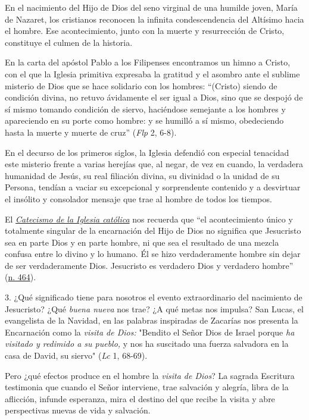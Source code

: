 En el nacimiento del Hijo de Dios del seno virginal de una humilde
joven, María de Nazaret, los cristianos reconocen la infinita
condescendencia del Altísimo hacia el hombre. Ese acontecimiento, junto
con la muerte y resurrección de Cristo, constituye el culmen de la
historia.

En la carta del apóstol Pablo a los Filipenses encontramos un himno a
Cristo, con el que la Iglesia primitiva expresaba la gratitud y el
asombro ante el sublime misterio de Dios que se hace solidario con los
hombres: ``(Cristo) siendo de condición divina, no retuvo ávidamente el
ser igual a Dios, sino que se despojó de sí mismo tomando condición de
siervo, haciéndose semejante a los hombres y apareciendo en su porte
como hombre: y se humilló a sí mismo, obedeciendo hasta la muerte y
muerte de cruz'' (\emph{Flp} 2, 6-8).

En el decurso de los primeros siglos, la Iglesia defendió con especial
tenacidad este misterio frente a varias herejías que, al negar, de vez
en cuando, la verdadera humanidad de Jesús, su real filiación divina, su
divinidad o la unidad de su Persona, tendían a vaciar su excepcional y
sorprendente contenido y a desvirtuar el insólito y consolador mensaje
que trae al hombre de todos los tiempos.

El
\emph{\href{http://www.vatican.va/archive/catechism_sp/index_sp.html}{Catecismo
		de la Iglesia católica}} nos recuerda que ``el acontecimiento único y
totalmente singular de la encarnación del Hijo de Dios no significa que
Jesucristo sea en parte Dios y en parte hombre, ni que sea el resultado
de una mezcla confusa entre lo divino y lo humano. Él se hizo
verdaderamente hombre sin dejar de ser verdaderamente Dios. Jesucristo
es verdadero Dios y verdadero hombre''
(\href{http://www.vatican.va/archive/catechism_sp/p1s2a3p1_sp.html\#III\%20Verdadero\%20Dios\%20y\%20verdadero\%20hombre}{n.
	464}).

3. ¿Qué significado tiene para nosotros el evento extraordinario del
nacimiento de Jesucristo? ¿Qué \emph{buena nueva} nos trae? ¿A qué metas
nos impulsa? San Lucas, el evangelista de la Navidad, en las palabras
inspiradas de Zacarías nos presenta la Encarnación como la \emph{visita
	de Dios:} "Bendito el Señor Dios de Israel porque \emph{ha visitado y
	redimido a su pueblo,} y nos ha suscitado una fuerza salvadora en la
casa de David, su siervo" (\emph{Lc} 1, 68-69).

Pero ¿qué efectos produce en el hombre la \emph{visita de Dios}? La
sagrada Escritura testimonia que cuando el Señor interviene, trae
salvación y alegría, libra de la aflicción, infunde esperanza, mira el
destino del que recibe la visita y abre perspectivas nuevas de vida y
salvación.

